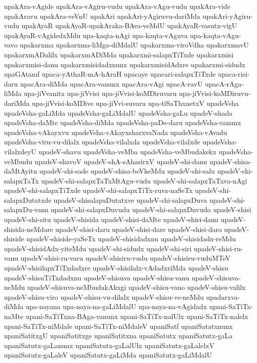 {upakAra-vAgide
upakAra-vAgiru-vudu
upakAra-vAgu-vudu
upakAra-vide
upakAravu
upakAra-veVnU
upakAri
upakAri-yAgiruvu-dariMda
upakAri-yAgiru-vudu
upakAyaR
upakAyaR-upakAraka-BAva-veMdU
upakAyaR-vasutx-vigU
upakAyaR-vAgidedxMdu
upa-kaqta-nAgi
upa-kaqta-vAguva
upa-kaqta-vAgu-vavo
upakarxma
upakarxma-liMga-diMdalU
upakarxma-viroVdha
upakarxmavU
upakarxmADalilx
upakarxmADiMda
upakarxmi-salapxTiTxde
upakarxmisi
upakarxmisi-danu
upakarxmisidadxnunx
upakarxmisidAdxre
upakarxmi-sidudx
upaGAtamf
upaca-yAthaR-mA-hAraH
upacaye
upacari-salapxTiTxde
upaca-risi-daru
upacAra-diMda
upacAra-vanunx
upacAra-vAgi
upacA-ravU
upacA-rAga-liMda
upa-jiVvanitx
upa-jiVvisi
upa-jiVvisi-koMDiruvaru
upa-jiVvisi-koMDiruvu-dariMda
upa-jiVvisi-koMDive
upa-jiVvi-suvaru
upa-tiSaThxnetxV
upadeVsha
upadeVsha-gaLiMda
upadeVsha-gaLiMdalU
upadeVsha-gaLu
upadeV-shada
upadeVsha-daMte
upadeVsha-diMda
upadeVsha-paDe-daru
upadeVsha-vanunx
upadeVsha-vAkayxvu
upadeVsha-vAkayxsharxvaNada
upadeVsha-vAvadu
upadeVsha-viru-vu-dilalx
upadeVsha-vilalxda
upadeVsha-vilalxde
upadeVsha-vilalxdeyU
upadeV-shavu
upadeVsha-veMba
upadeVsha-veMbudakekx
upadeVsha-veMbudu
upadeV-shavoV
upadeV-shA-sAhasirxV
upadeV-shi-danu
upadeV-shisa-daMtAyitu
upadeV-shi-sade
upadeV-shisa-beVkeMdu
upadeV-shi-salu
upadeV-shi-salapxTaTx
upadeV-shi-salapxTaTxMtAgu-vudu
upadeV-shi-salapxTaTxva-nAgi
upadeV-shi-salapxTiTxde
upadeV-shi-salapxTiTx-ruva-naSeTx
upadeV-shi-salapxDutatxde
upadeV-shisalapxDutatxve
upadeV-shi-salapxDuva
upadeV-shi-salapxDu-vanu
upadeV-shi-salapxDuvudu
upadeV-shi-salapxDuvudo
upadeV-shisi
upadeV-shi-situ
upadeV-shisida
upadeV-shisi-daMte
upadeV-shisi-danu
upadeV-shisida-neMdare
upadeV-shisi-daru
upadeV-shisi-dare
upadeV-shisi-daro
upadeV-shiside
upadeV-shiside-yaSeTx
upadeV-shisidadxnu
upadeV-shisidadx-reMdu
upadeV-shisidAdx-yiteMdu
upadeV-shi-sidudx
upadeV-shi-siri
upadeV-shisi-ru-vanu
upadeV-shisi-ru-varu
upadeV-shisiru-vudu
upadeV-shisiru-vuduMTeV
upadeV-shisilapxTiTxdadxre
upadeV-shisilalx-vAdadxriMda
upadeV-shisu
upadeV-shisuTiTxdadxnu
upadeV-shisuva
upadeV-shisu-vanu
upadeV-shisuva-neMdu
upadeV-shisuva-neMbudakAkxgi
upadeV-shisu-vano
upadeV-shisu-valilx
upadeV-shisu-viro
upadeV-shisu-vu-dilalx
upadeV-shisu-ve-neMdu
upadarxva-diMda
upa-nayana
upa-naya-na-gaLiMdalU
upa-naya-na-vAgidadx
upani-SaTiTx-naMte
upani-SaTiTxna-BAga-vanunx
upani-SaTiTx-nalUlx
upani-SaTiTx-nalelx
upani-SaTiTx-niMdale
upani-SaTiTx-niMdaleV
upaniSatf
upaniSatatxnunx
upaniSatitxgU
upaniSatitxge
upaniSatitxna
upaniSatutx
upaniSatutx-gaLa
upaniSatutx-gaLanunx
upaniSatutx-gaLalUlx
upaniSatutx-gaLalelxV
upaniSatutx-gaLaleV
upaniSatutx-gaLiMda
upaniSatutx-gaLiMdalU
}
